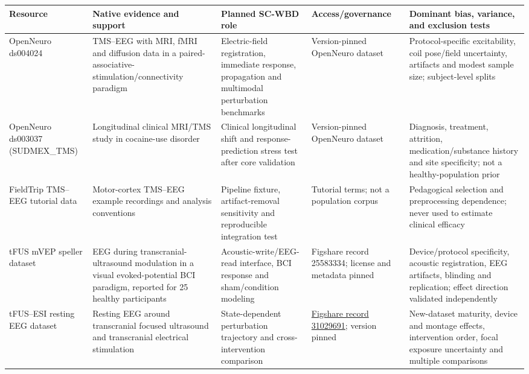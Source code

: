 \clearpage
\begin{table}[!h]
\centering
\footnotesize
\setlength{\tabcolsep}{3pt}
\renewcommand{\arraystretch}{1.08}
\begin{tabularx}{\textwidth}{@{}p{}p{}p{}p{}X@{}}
\toprule
\textbf{Resource} & \textbf{Native evidence and support} &
\textbf{Planned SC-WBD role} & \textbf{Access/governance} &
\textbf{Dominant bias, variance, and exclusion tests}\\
\midrule
OpenNeuro ds004024 &
TMS--EEG with MRI, fMRI and diffusion data in a
paired-associative-stimulation/connectivity paradigm &
Electric-field registration, immediate response, propagation and multimodal
perturbation benchmarks &
Version-pinned OpenNeuro dataset &
Protocol-specific excitability, coil pose/field uncertainty, artifacts and
modest sample size; subject-level splits\\

OpenNeuro ds003037 (SUDMEX\_TMS) &
Longitudinal clinical MRI/TMS study in cocaine-use disorder &
Clinical longitudinal shift and response-prediction stress test after core
validation &
Version-pinned OpenNeuro dataset &
Diagnosis, treatment, attrition, medication/substance history and site
specificity; not a healthy-population prior\\

FieldTrip TMS--EEG tutorial data &
Motor-cortex TMS--EEG example recordings and analysis conventions &
Pipeline fixture, artifact-removal sensitivity and reproducible integration
test &
Tutorial terms; not a population corpus &
Pedagogical selection and preprocessing dependence; never used to estimate
clinical efficacy\\

tFUS mVEP speller dataset &
EEG during transcranial-ultrasound modulation in a visual evoked-potential
BCI paradigm, reported for 25 healthy participants &
Acoustic-write/EEG-read interface, BCI response and sham/condition modeling &
Figshare record 25583334; license and metadata pinned &
Device/protocol specificity, acoustic registration, EEG artifacts, blinding
and replication; effect direction validated independently\\

tFUS--ESI resting EEG dataset &
Resting EEG around transcranial focused ultrasound and transcranial
electrical stimulation &
State-dependent perturbation trajectory and cross-intervention comparison &
\href{https://doi.org/10.6084/m9.figshare.31029691}{Figshare record 31029691};
version pinned &
New-dataset maturity, device and montage effects, intervention order, focal
exposure uncertainty and multiple comparisons\\


\end{tabularx}
\end{table}
